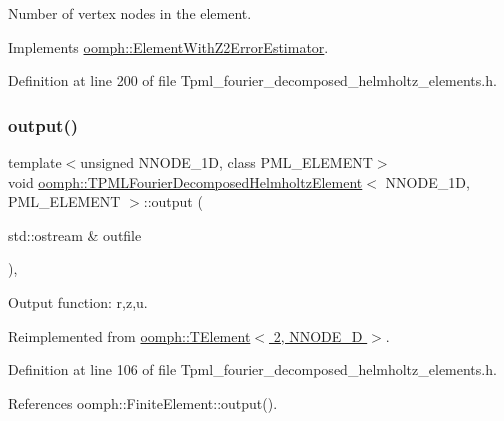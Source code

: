 Number of vertex nodes in the element. 



Implements \hyperlink{classoomph_1_1ElementWithZ2ErrorEstimator_a19495a0e77ef4ff35f15fdf7913b4077}{oomph\+::\+Element\+With\+Z2\+Error\+Estimator}.



Definition at line 200 of file Tpml\+\_\+fourier\+\_\+decomposed\+\_\+helmholtz\+\_\+elements.\+h.

\mbox{\label{classoomph_1_1TPMLFourierDecomposedHelmholtzElement_a7740f7614bd05db89ddf4e39668b8a75}} 
\subsubsection{\texorpdfstring{output()}{output()}\hspace{0.1cm}{\footnotesize\ttfamily [1/4]}}
{\footnotesize\ttfamily template$<$unsigned N\+N\+O\+D\+E\+\_\+1D, class P\+M\+L\+\_\+\+E\+L\+E\+M\+E\+NT$>$ \\
void \hyperlink{classoomph_1_1TPMLFourierDecomposedHelmholtzElement}{oomph\+::\+T\+P\+M\+L\+Fourier\+Decomposed\+Helmholtz\+Element}$<$ N\+N\+O\+D\+E\+\_\+1D, P\+M\+L\+\_\+\+E\+L\+E\+M\+E\+NT $>$\+::output (\begin{DoxyParamCaption}\item[{std\+::ostream \&}]{outfile }\end{DoxyParamCaption})\hspace{0.3cm}{\ttfamily [inline]}, {\ttfamily [virtual]}}



Output function\+: r,z,u. 



Reimplemented from \hyperlink{classoomph_1_1TElement_3_012_00_01NNODE__1D_01_4_ad66ccbcca9ee2a4eb3c24bdd21c096f9}{oomph\+::\+T\+Element$<$ 2, N\+N\+O\+D\+E\+\_\+D $>$}.



Definition at line 106 of file Tpml\+\_\+fourier\+\_\+decomposed\+\_\+helmholtz\+\_\+elements.\+h.



References oomph\+::\+Finite\+Element\+::output().

